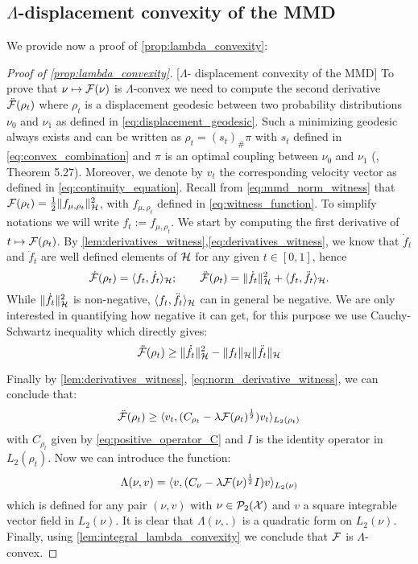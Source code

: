 \subsection{$\Lambda$-displacement convexity of the MMD}

We provide now a proof of \cref{prop:lambda_convexity}:
\begin{proof}[Proof of \cref{prop:lambda_convexity}]\label{proof:prop:lambda_convexity}[$\Lambda$- displacement convexity of the MMD]
To prove that $\nu\mapsto {{\mathcal F}}(\nu)$ is $\Lambda$-convex
we need to compute the second derivative $\ddot{{{\mathcal F}}}(\rho_{t})$
where $\rho_{t}$ is a displacement geodesic between two probability
distributions $\nu_{0}$ and $\nu_{1}$ as defined in \cref{eq:displacement_geodesic}. Such a minimizing geodesic always exists and can be written as $\rho_t = (s_t)_{\#}\pi$ with $s_t$ defined in \cref{eq:convex_combination} and $\pi$ is an optimal coupling between $\nu_0$ and $\nu_1$ (\cite{Santambrogio:2015}, Theorem 5.27). Moreover, we denote by $v_t$ the corresponding velocity vector as defined in \cref{eq:continuity_equation}. Recall from \cref{eq:mmd_norm_witness} that ${{\mathcal F}}(\rho_t) = \frac{1}{2} \Vert f_{\mu,\rho_t}\Vert^2_{\mathcal{H}}$, with $f_{\mu,\rho_t}$ defined in \cref{eq:witness_function}. To simplify notations we will write $f_t:= f_{\mu,\rho_t}$. We start by computing the first derivative of $ t\mapsto {{\mathcal F}}(\rho_t) $. By  \cref{lem:derivatives_witness},\cref{eq:derivatives_witness}, we know that $\dot{f}_t$ and $\ddot{f}_t $ are well defined elements of ${{\mathcal H}}$ for any given $t\in [0,1]$, hence 
\[
 \dot{{{\mathcal F}}}(\rho_t) = \langle f_t, \dot{f_t}\rangle_{{{\mathcal H}}};\qquad \ddot{{{\mathcal F}}}(\rho_t) = \Vert \dot{f_t}\Vert^2_{{{\mathcal H}}} + \langle f_t, \ddot{f_t}\rangle_{{{\mathcal H}}}.
 \]
While $\Vert \dot{f_t}\Vert^2_{{{\mathcal H}}}$ is non-negative, $\langle f_t, \ddot{f_t}\rangle_{{{\mathcal H}}}$ can in general be negative. We are only interested in quantifying how negative it can get, for this purpose we use Cauchy-Schwartz inequality which directly gives:
\[
\ddot{{{\mathcal F}}}(\rho_t)\geq  \Vert \dot{f}_t \Vert^2_{{{\mathcal H}}} - \Vert f_t \Vert_{{{\mathcal H}}}\Vert \ddot{f}_t\Vert_{{{\mathcal H}}} 
\]

Finally by \cref{lem:derivatives_witness}, \cref{eq:norm_derivative_witness}, we can conclude that:
\[
	\ddot{{{\mathcal F}}}(\rho_t)\geq  \langle v_t,(C_{\rho_t} - \lambda {{\mathcal F}}(\rho_t)^{\frac{1}{2}}) v_t \rangle_{L_2(\rho_t)} 
\]
with $C_{\rho_t}$ given by \cref{eq:positive_operator_C} and $I$ is the identity operator in $L_2(\rho_t)$. Now we can introduce the function:
\begin{align}
	\Lambda(\nu,v) = \langle v ,( C_{\nu} -\lambda {{\mathcal F}}(\nu)^{\frac{1}{2}} I) v \rangle_{L_2(\nu)} 
\end{align}
which is defined for any pair $(\nu,v)$ with  $\nu\in \mathcal{P}_2({{\mathcal X}})$ and $v$ a square integrable vector field in $L_2(\nu)$. It is clear that $\Lambda(\nu,.)$  is a quadratic form on $L_2(\nu)$. Finally, using \cref{lem:integral_lambda_convexity} we conclude that ${{\mathcal F}}$ is $\Lambda$-convex.
\end{proof}

